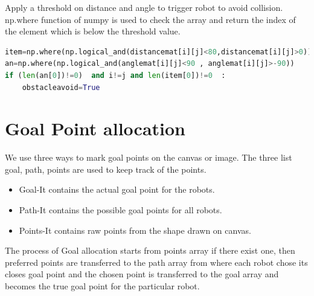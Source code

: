 \documentclass[main.tex]{subfiles}
\begin{document}
Apply a threshold on distance and angle to trigger robot to avoid collision.
np.where function of numpy is used to check the array and return the index of the element which is below the threshold value.

\begin{lstlisting}[language=Python, caption = Searching matrix ]
item=np.where(np.logical_and(distancemat[i][j]<80,distancemat[i][j]>0)) 
an=np.where(np.logical_and(anglemat[i][j]<90 , anglemat[i][j]>-90))
if (len(an[0])!=0)  and i!=j and len(item[0])!=0  : 
	obstacleavoid=True
\end{lstlisting}

\section{Goal Point allocation}
We use three ways to mark goal points on the canvas or image.
The three list goal, path, points are used to keep track of the points.

\begin{itemize}
	\item Goal-It contains the actual goal point for the robots.
	\item Path-It contains the possible goal points for all robots.
	\item Points-It contains raw points from the shape drawn on canvas.
\end{itemize}
The process of Goal allocation starts from points array if there exist one, then preferred points are transferred to the path array from where each robot chose its closes goal point and the chosen point is transferred to the goal array and becomes the true goal point for the particular robot.
\end{document}

